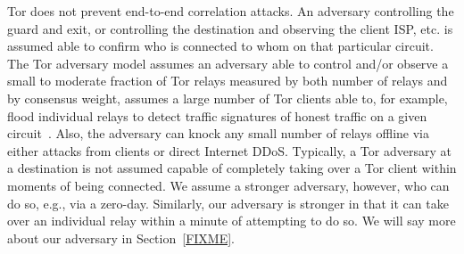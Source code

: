 Tor does not prevent end-to-end correlation attacks. An adversary
controlling the guard and exit, or controlling the destination and
observing the client ISP, etc. is assumed able to confirm who is
connected to whom on that particular circuit. The Tor adversary model
assumes an adversary able to control and/or observe a small to
moderate fraction of Tor relays measured by both number of relays and
by consensus weight, assumes a large number of Tor clients able to,
for example, flood individual relays to detect traffic signatures of
honest traffic on a given circuit~\cite{long-paths}. Also, the
adversary can knock any small number of relays offline via either
attacks from clients or direct Internet DDoS\@. Typically, a
Tor adversary at a destination is not assumed capable of completely
taking over a Tor client within moments of being connected. We
assume a stronger adversary, however, who can do so, e.g., via a zero-day.
Similarly, our adversary is stronger in that it can take over
an individual relay within a minute of attempting to do so. We will say
more about our adversary in Section~\ref{FIXME}. 




